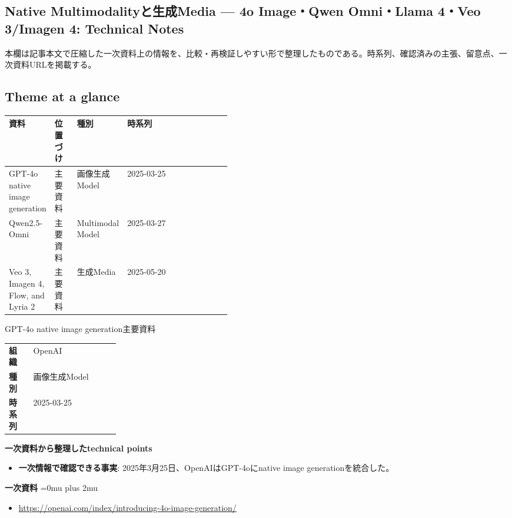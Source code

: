 \subsection*{Native Multimodalityと生成Media — 4o Image・Qwen Omni・Llama 4・Veo 3/Imagen 4: Technical Notes}
本欄は記事本文で圧縮した一次資料上の情報を、比較・再検証しやすい形で整理したものである。時系列、確認済みの主張、留意点、一次資料URLを掲載する。
\medskip
\subsection*{Theme at a glance}
\begin{center}
\footnotesize
\begin{tabularx}{\linewidth}{@{}p{0.20\linewidth}p{0.10\linewidth}p{0.14\linewidth}X@{}}
\toprule
資料 & 位置づけ & 種別 & 時系列 \\
\midrule
GPT-4o native image generation & 主要資料 & 画像生成Model & 2025-03-25 \\
Qwen2.5-Omni & 主要資料 & Multimodal Model & 2025-03-27 \\
Veo 3, Imagen 4, Flow, and Lyria 2 & 主要資料 & 生成Media & 2025-05-20 \\
\bottomrule
\end{tabularx}
\end{center}
\normalsize

\begin{technicalnote}{GPT-4o native image generation}{主要資料}
\begingroup
\begin{tabularx}{\linewidth}{@{}>{\bfseries}p{0.22\linewidth}X@{}}
組織 & OpenAI \\
種別 & 画像生成Model \\
時系列 & 2025-03-25 \\
\end{tabularx}
\smallskip
{\bfseries 一次資料から整理したtechnical points}
\begin{itemize}[leftmargin=1.5em,itemsep=0.35em]
\item \textbf{一次情報で確認できる事実}: 2025年3月25日、OpenAIはGPT-4oにnative image generationを統合した。
\end{itemize}
\begin{samepage}
{\bfseries 一次資料}
\begingroup\sloppy
\Urlmuskip=0mu plus 2mu\relax
\begin{itemize}[leftmargin=1.5em,itemsep=0.25em]
\item {\scriptsize\url{https://openai.com/index/introducing-4o-image-generation/}}
\end{itemize}
\endgroup
\end{samepage}
\endgroup
\end{technicalnote}
\medskip

